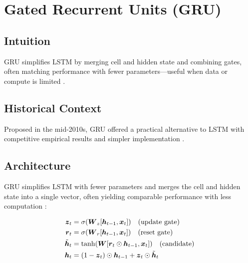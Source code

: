 
\section{Gated Recurrent Units (GRU)}
\label{sec:gru}

\subsection*{Intuition}

GRU simplifies LSTM by merging cell and hidden state and combining gates, often matching performance with fewer parameters—useful when data or compute is limited \cite{Cho2014,GoodfellowEtAl2016}.

\subsection*{Historical Context}

Proposed in the mid-2010s, GRU offered a practical alternative to LSTM with competitive empirical results and simpler implementation \cite{Cho2014}.


\subsection{Architecture}

GRU simplifies LSTM with fewer parameters and merges the cell and hidden state into a single vector, often yielding comparable performance with less computation \cite{Cho2014,GoodfellowEtAl2016}:

\begin{align}
\boldsymbol{z}_t &= \sigma(\boldsymbol{W}_z [\boldsymbol{h}_{t-1}, \boldsymbol{x}_t]) \quad \text{(update gate)} \\
\boldsymbol{r}_t &= \sigma(\boldsymbol{W}_r [\boldsymbol{h}_{t-1}, \boldsymbol{x}_t]) \quad \text{(reset gate)} \\
\tilde{\boldsymbol{h}}_t &= \tanh(\boldsymbol{W} [\boldsymbol{r}_t \odot \boldsymbol{h}_{t-1}, \boldsymbol{x}_t]) \quad \text{(candidate)} \\
\boldsymbol{h}_t &= (1 - \boldsymbol{z}_t) \odot \boldsymbol{h}_{t-1} + \boldsymbol{z}_t \odot \tilde{\boldsymbol{h}}_t
\end{align}

